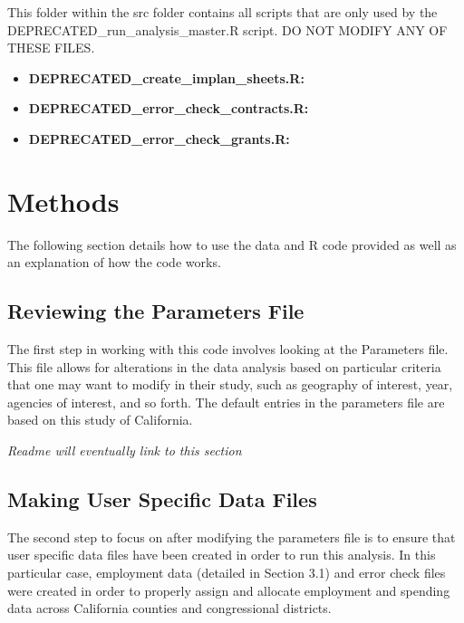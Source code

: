 \documentclass[
]{book}
\providecommand{\tightlist}{%
  \setlength{\itemsep}{0pt}\setlength{\parskip}{0pt}}
\begin{document}
This folder within the src folder contains all scripts that are only used by the DEPRECATED\_run\_analysis\_master.R script. DO NOT MODIFY ANY OF THESE FILES.

\begin{itemize}
\tightlist
\item
  \textbf{DEPRECATED\_create\_implan\_sheets.R:}
\item
  \textbf{DEPRECATED\_error\_check\_contracts.R:}
\item
  \textbf{DEPRECATED\_error\_check\_grants.R:}
\end{itemize}

\hypertarget{methods}{%
\chapter{Methods}\label{methods}}

The following section details how to use the data and R code provided as well as an explanation of how the code works.

\hypertarget{reviewing-the-parameters-file}{%
\section{Reviewing the Parameters File}\label{reviewing-the-parameters-file}}

The first step in working with this code involves looking at the Parameters file. This file allows for alterations in the data analysis based on particular criteria that one may want to modify in their study, such as geography of interest, year, agencies of interest, and so forth. The default entries in the parameters file are based on this study of California.

\emph{Readme will eventually link to this section}

\hypertarget{making-user-specific-data-files}{%
\section{Making User Specific Data Files}\label{making-user-specific-data-files}}

The second step to focus on after modifying the parameters file is to ensure that user specific data files have been created in order to run this analysis. In this particular case, employment data (detailed in Section 3.1) and error check files were created in order to properly assign and allocate employment and spending data across California counties and congressional districts.
\end{document}
